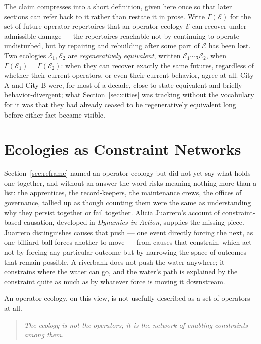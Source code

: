 \documentclass[11pt]{article}
\newcommand{\Ecol}{\mathcal{E}}
\newcommand{\Reach}{\mathsf{R}}
\newcommand{\Fut}{\Gamma}
\begin{document}
The claim compresses into a short definition, given here once so that
later sections can refer back to it rather than restate it in prose.
Write $\Fut(\Ecol)$ for the set of future operator repertoires that
an operator ecology $\Ecol$ can recover under admissible damage ---
the repertoires reachable not by continuing to operate undisturbed,
but by repairing and rebuilding after some part of $\Ecol$ has been
lost. Two ecologies $\Ecol_1,\Ecol_2$ are \emph{regeneratively
equivalent}, written $\Ecol_1\sim_{\Reach}\Ecol_2$, when
$\Fut(\Ecol_1)=\Fut(\Ecol_2)$: when they can recover exactly the same
futures, regardless of whether their current operators, or even their
current behavior, agree at all. City A and City B were, for most of a
decade, close to state-equivalent and briefly behavior-divergent; what
Section~\ref{sec:cities} was tracking without the vocabulary for it
was that they had already ceased to be regeneratively equivalent long
before either fact became visible.

\section{Ecologies as Constraint Networks}\label{sec:constraints}

Section~\ref{sec:reframe} named an operator ecology but did not yet
say what holds one together, and without an answer the word risks
meaning nothing more than a list: the apprentices, the record-keepers,
the maintenance crews, the offices of governance, tallied up as though
counting them were the same as understanding why they persist together
or fail together. Alicia Juarrero's account of constraint-based
causation, developed in \emph{Dynamics in Action}, supplies the
missing piece. Juarrero distinguishes causes that push --- one event
directly forcing the next, as one billiard ball forces another to
move --- from causes that constrain, which act not by forcing any
particular outcome but by narrowing the space of outcomes that remain
possible. A riverbank does not push the water anywhere; it constrains
where the water can go, and the water's path is explained by the
constraint quite as much as by whatever force is moving it downstream.

An operator ecology, on this view, is not usefully described as a
set of operators at all.

\begin{quote}
\emph{The ecology is not the operators; it is the network of enabling
constraints among them.}
\end{quote}
\end{document}
